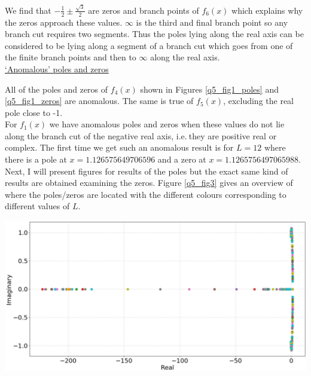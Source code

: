 \documentclass[12pt, a4paper]{article}
\begin{document}
We find that $-\frac{1}{2} \pm \frac{\sqrt{3}}{2}$ are zeros and branch points of $f_{6}(x)$ which
explains why the zeros approach these values. $\infty$ is the third and final branch point so any branch
cut requires two segments. Thus the poles lying along the real axis can be considered to be lying along
a segment of a branch cut which goes from one of the finite branch points and then to $\infty$ along 
the real axis.
\\

\vspace{0.4cm}
\underline{‘Anomalous’ poles and zeros}

\vspace{0.5cm}
All of the poles and zeros of $f_{4}(x)$ shown in Figures \ref{q5_fig1_poles} and \ref{q5_fig1_zeros}
are anomalous. The same is true of $f_{5}(x)$, excluding the real pole close to -1.
\\

For $f_{1}(x)$ we have anomalous poles and zeros when these values do not lie along the branch cut
of the negative real axis, i.e.$~$they are positive real or complex. The first time we get such an
anomalous result is for $L = 12$ where there is a pole at $x = 1.126575649706596$ and a zero at 
$x = 1.1265756497065988$. Next, I will present figures for results of the poles but the exact same 
kind of results are obtained examining the zeros. Figure \ref{q5_fig3} gives an overview of where 
the poles/zeros are located with the different colours corresponding to different values of $L$.

\vspace{0.3cm}
\begin{minipage}{\textwidth}
	\centering
	\includegraphics[width=\linewidth]{q5_fig3}

	\vspace*{-0.3cm}

	\label{q5_fig3}
\end{minipage}
\\
\end{document}

